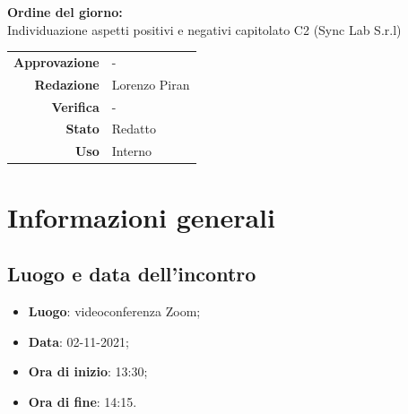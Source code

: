 \documentclass[11pt]{article}
\begin{document}
\begin{titlepage}
\begin{center}
			\large
			
			\vfill
			\textbf{Ordine del giorno:} \\
			Individuazione aspetti positivi e negativi capitolato C2 (Sync Lab S.r.l)
			
			
			\vfill
			
			
			\begin{tabular}{r|l}
				\textbf{Approvazione} &  -\\
				\textbf{Redazione} &  \parbox[t]{5cm}{Lorenzo Piran}\\
				\textbf{Verifica} &  -\\
				\textbf{Stato} & Redatto \\
				\textbf{Uso} & Interno
			\end{tabular}
			\vfill
			
		\end{center}
	\end{titlepage}

	\section{Informazioni generali}
	\subsection{Luogo e data dell'incontro}
	\begin{itemize}
		\item \textbf{Luogo}: videoconferenza Zoom;
		\item \textbf{Data}: 02-11-2021;
		\item \textbf{Ora di inizio}: 13:30;
		\item \textbf{Ora di fine}: 14:15.
	\end{itemize}
	
\end{document}
